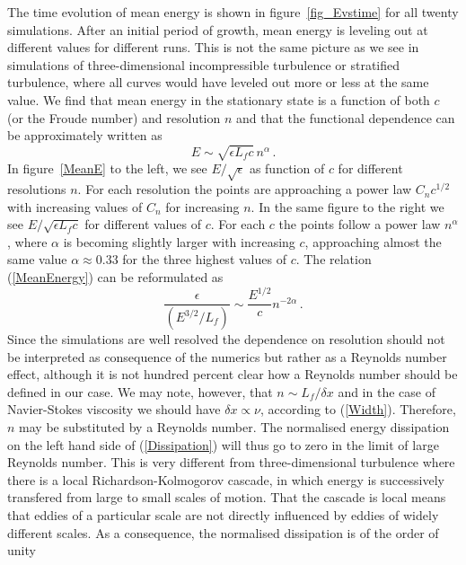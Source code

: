 \documentclass{jfm}
\begin{document}
The time evolution of mean energy is shown in figure~\ref{fig_Evstime} for all
twenty simulations. After an initial period of growth, mean energy is leveling
out at different values for different runs. This is not the same picture as we
see in simulations of three-dimensional incompressible turbulence or stratified
turbulence, where all curves would have leveled out more or less at the same
value. We find that mean energy in the stationary state is a function of both $
c $ (or the Froude number) and resolution $ n $ and that the functional
dependence can be approximately written as
\begin{equation} \label{MeanEnergy}
E \sim \sqrt{\epsilon L_f c } \, n^{\alpha}  \, .
\end{equation}
 In figure~\ref{MeanE} to the
left, we see $ E/\sqrt{\epsilon} $ as function of $ c $ for different resolutions $
n $. For each resolution the points are approaching a power law $ C_n c^{1/2} $
with increasing values of $ C_n $ for increasing $ n $. In the same figure to
the right we see $ E/\sqrt{\epsilon L_f c } $ for different values of $ c $. For
each $ c $ the points follow a power law $ n^{\alpha} $, where $ \alpha $ is
becoming slightly larger with increasing $ c $, approaching almost the same
value $ \alpha \approx 0.33 $ for the three highest values of $ c $. The
relation (\ref{MeanEnergy}) can be reformulated as
\begin{equation} \label{Dissipation}
\frac{\epsilon} {(E^{3/2} / L_f)} \sim \frac{E^{1/2}}{c} n^{-2\alpha} \, .
\end{equation}
Since the simulations are well resolved the dependence on resolution should not
be interpreted as consequence of the numerics but rather as a Reynolds number
effect, although it is not hundred percent clear how a Reynolds number should
be defined in our case. We may note, however, that $ n \sim L_f/\delta x $ and in the case of Navier-Stokes viscosity
 we should have $ \delta x \propto \nu $, according to (\ref{Width}). Therefore,  $ n $ may be substituted by a Reynolds number. The normalised energy dissipation on the left hand side of
(\ref{Dissipation}) will thus go to zero in the limit of large Reynolds number.
This is very different from three-dimensional turbulence where there is a local
Richardson-Kolmogorov cascade, in which energy is successively transfered from
large to small scales of motion. That the cascade is local means that eddies of
a particular scale are not directly influenced by eddies of widely different
scales. As a consequence, the normalised dissipation is of the order of unity
\end{document}
